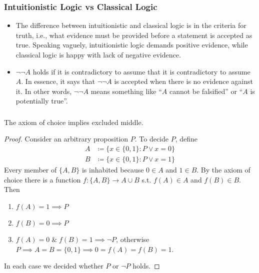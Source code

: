 \documentclass[UTF8,11pt,colorlinks,compress,openany]{beamer}%
\begin{document}
\begin{frame}\frametitle{Intuitionistic Logic vs Classical Logic}
\begin{itemize}
	\item The difference between intuitionistic and classical logic is in the criteria for truth, i.e., what evidence must be provided before a statement is accepted as true. Speaking vaguely, intuitionistic logic demands positive evidence, while classical logic is happy with lack of negative evidence.
	\item $\neg\neg A$ holds if it is contradictory to assume that it is contradictory to assume $A$. In essence, it says that $\neg\neg A$ is accepted when there is no evidence against it. In other words, $\neg\neg A$ means something like ``$A$ cannot be falsified'' or ``$A$ is potentially true''.
\end{itemize}
\end{frame}

\begin{frame}\frametitle{}
\begin{theorem}
The axiom of choice implies excluded middle.
\end{theorem}
\begin{proof}
Consider an arbitrary proposition $P$. To decide $P$, define
\begin{align*}
A&\coloneqq\big\{x\in\{0,1\}: P\vee x=0\big\}\\
B&\coloneqq\big\{x\in\{0,1\}: P\vee x=1\big\}
\end{align*}
Every member of $\{A,B\}$ is inhabited because $0\in A$ and $1\in B$. By the axiom of choice there is a function $f:\{A,B\}\to A\cup B$ s.t. $f(A)\in A$ and $f(B)\in B$. Then
\begin{enumerate}
	\item $f(A)=1\implies P$
	\item $f(B)=0\implies P$
	\item $f(A)=0\;\&\; f(B)=1\implies\neg P$, otherwise $P\implies A=B=\{0,1\}\implies 0=f(A)=f(B)=1$.
\end{enumerate}
In each case we decided whether $P$ or $\neg P$ holds.
\end{proof}
\end{frame}
\end{document}
